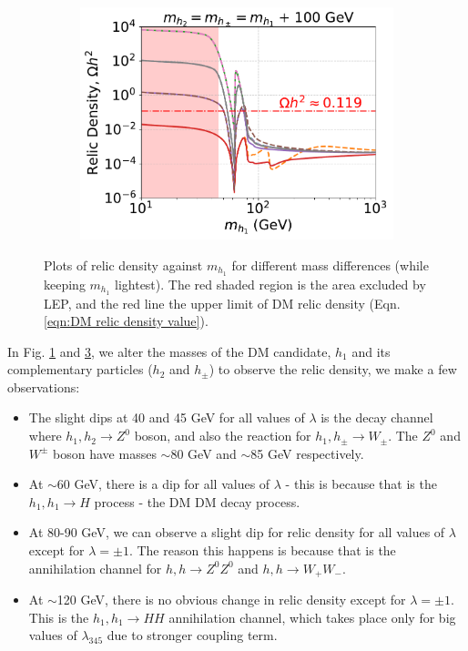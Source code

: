 \documentclass[12pt]{article}
\begin{document}
\begin{figure}[H]
\begin{subfigure}[b]{0.49\textwidth}
        \caption{}
        \label{fig:MD1_l345_1}
    \end{subfigure}
    \hfill
    \begin{subfigure}[b]{0.49\textwidth}
        \centering
        \includegraphics[width=\textwidth]{plots/plot_MD1_l345+100(no_legend).pdf}
        \caption{}
        \label{fig:MD1_l345_100}
    \end{subfigure}
    \caption{Plots of relic density against $m_{h_1}$ for different mass differences (while keeping $m_{h_1}$ lightest). The red shaded region is the area excluded by LEP, and the red line the upper limit of DM relic density (Eqn. \ref{eqn:DM relic density value}).}
\end{figure}

In Fig. \ref{fig:MD1_l345_1} and \ref{fig:MD1_l345_100}, we alter the masses of the DM candidate, $h_1$ and its complementary particles ($h_2$ and $h_{\pm}$) to observe the relic density, we make a few observations:
\begin{itemize}
    \item The slight dips at 40 and 45 GeV for all values of $\lambda$ is the decay channel where $h_1, h_2 \rightarrow Z^0$ boson, and also the reaction for $h_1, h_{\pm} \rightarrow W_\pm$. The $Z^0$ and $W^\pm$ boson have masses $\sim$80 GeV and $\sim$85 GeV respectively.
    \item At $\sim$60 GeV, there is a dip for all values of $\lambda$ - this is because that is the $h_1,h_1\rightarrow H$ process - the DM DM decay process. 
    \item At 80-90 GeV, we can observe a slight dip for relic density for all values of $\lambda$ except for $\lambda = \pm1$. The reason this happens is because that is the annihilation channel for $h, h \rightarrow Z^0Z^0$ and $h, h \rightarrow W_+ W_-$.
    \item At $\sim$120 GeV, there is no obvious change in relic density except for $\lambda = \pm1$. This is the $h_1,h_1\rightarrow H H$ annihilation channel, which takes place only for big values of $\lambda_{345}$ due to stronger coupling term.
\end{itemize}
\end{document}
